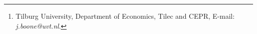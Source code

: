 \author{Jan Boone\thanks{Tilburg University, Department of Economics, Tilec and CEPR, E-mail: \textit{j.boone@uvt.nl}.}}
